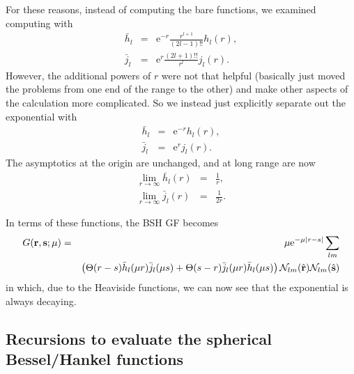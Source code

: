 \documentclass[12pt]{article}
\newcommand{\N}{\mathcal{N}}
\newcommand{\rv}{\vb{r}}
\newcommand{\sv}{\vb{s}}
\newcommand{\rhat}{\hat{\rv}}
\newcommand{\shat}{\hat{\sv}}
\begin{document}
For these reasons, instead of computing the bare functions, we examined computing with
\begin{eqnarray*}
  \bar{h}_l & = & {\mathrm e}^{-r} \frac{r^{l+1}}{(2l-1)!!} h_l(r) ,\\
  \bar{j}_l & = & {\mathrm e}^{r} \frac{(2l+1)!!}{r^l} j_l(r).
\end{eqnarray*}
However, the additional powers of $r$ were not that helpful (basically just moved the problems from one end of the range to the other) and make other aspects of the calculation more complicated.  So we instead just explicitly separate out the exponential with
\begin{eqnarray}
  \bar{h}_l & = & {\mathrm e}^{-r} h_l(r) , \\
  \bar{j}_l & = & {\mathrm e}^{r} j_l(r) .
\end{eqnarray}
The asymptotics at the origin are unchanged, and at long range are now
\begin{eqnarray}
  \lim_{r \rightarrow \infty} \bar{h}_l(r) & = & \frac{1}{r}, \\
  \lim_{r \rightarrow \infty} \bar{j}_l(r) & = & \frac{1}{2r} .
\end{eqnarray}

In terms of these functions, the BSH GF becomes
\begin{eqnarray}
  G(\rv,\sv; \mu) & = & \mu {\mathrm e}^{-\mu |r-s|}
  \sum_{lm} \\
  & & 
  \left(    
  \Theta(r-s) \bar{h}_l(\mu r) \bar{j}_l(\mu s)
  +
  \Theta(s-r) \bar{j}_l(\mu r) \bar{h}_l(\mu s)
  \right)
  \N_{lm}(\rhat) \N_{lm}(\shat)
\end{eqnarray}
in which, due to the Heaviside functions, we can now see that the exponential is always decaying.

\subsection{Recursions to evaluate the spherical Bessel/Hankel functions}
\end{document}
